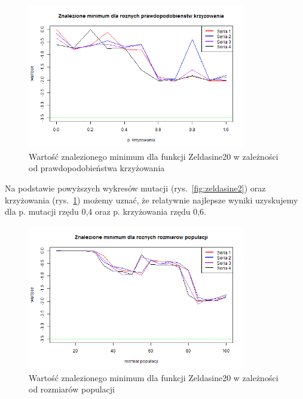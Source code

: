 \documentclass[11pt, a4paper]{article}
\newcommand{\fbi}{\leavevmode{\parindent=1em\indent}}
\begin{document}
\begin{figure}[H]
	\begin{center}
		\includegraphics[width=0.85\textwidth]{./assets/Zeldasine203.png}
		\caption{Wartość znalezionego minimum dla funkcji Zeldasine20 w zależności od prawdopodobieństwa krzyżowania}
		\label{fig:zeldasine3}
	\end{center}
\end{figure}

\fbi
Na podstawie powyższych wykresów mutacji (rys.~\ref{fig:zeldasine2}) oraz krzyżowania (rys.~\ref{fig:zeldasine3}) możemy uznać, że relatywnie najlepsze wyniki uzyskujemy dla p. mutacji rzędu 0,4 oraz p. krzyżowania rzędu 0,6.

\begin{figure}[H]
	\begin{center}
		\includegraphics[width=0.85\textwidth]{./assets/Zeldasine204.png}
		\caption{Wartość znalezionego minimum dla funkcji Zeldasine20 w zależności od rozmiarów populacji}
		\label{fig:zeldasine4}
	\end{center}
\end{figure}
\end{document}
